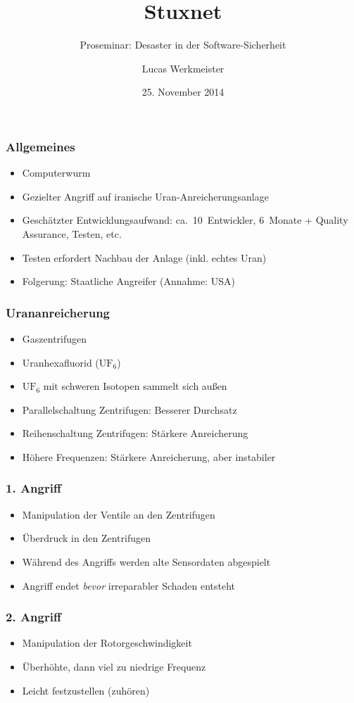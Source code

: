 \documentclass{beamer}
\title{Stuxnet}
\subtitle{Proseminar: Desaster in der Software-Sicherheit}
\author{Lucas Werkmeister}
\date{25. November 2014}
\begin{document}
\newcommand{\ufsechs}[0]{$\mathrm{UF_6}$\xspace}

\begin{frame}
  \titlepage
\end{frame}

\begin{frame}
  \frametitle{Allgemeines}
  \begin{itemize}
    \item Computerwurm
    \item Gezielter Angriff auf iranische Uran-Anreicherungsanlage
    \item Geschätzter Entwicklungsaufwand: ca.~10~Entwickler, 6~Monate + Quality Assurance, Testen, etc.
    \item Testen erfordert Nachbau der Anlage (inkl. echtes Uran)
    \item Folgerung: Staatliche Angreifer (Annahme: USA)
  \end{itemize}
\end{frame}

\begin{frame}
  \frametitle{Urananreicherung}
  \begin{itemize}
    \item Gaszentrifugen
    \item Uranhexafluorid (\ufsechs)
    \item \ufsechs mit schweren Isotopen sammelt sich außen
    \item Parallelschaltung Zentrifugen: Besserer Durchsatz
    \item Reihenschaltung Zentrifugen: Stärkere Anreicherung
    \item Höhere Frequenzen: Stärkere Anreicherung, aber instabiler
  \end{itemize}
\end{frame}

\begin{frame}
  \frametitle{1. Angriff}
  \begin{itemize}
    \item Manipulation der Ventile an den Zentrifugen
    \item Überdruck in den Zentrifugen
    \item Während des Angriffs werden alte Sensordaten abgespielt
    \item Angriff endet \emph{bevor} irreparabler Schaden entsteht
  \end{itemize}
\end{frame}

\begin{frame}
  \frametitle{2. Angriff}
  \begin{itemize}
    \item Manipulation der Rotorgeschwindigkeit
    \item Überhöhte, dann viel zu niedrige Frequenz
    \item Leicht festzustellen (zuhören)
  \end{itemize}
\end{frame}
\end{document}
